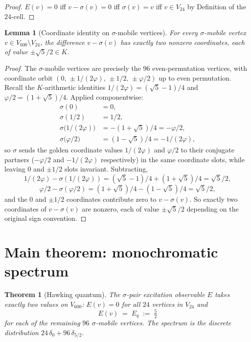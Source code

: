 \documentclass[11pt]{article}
\newtheorem{theorem}{Theorem}[section]
\newtheorem{lemma}{Lemma}[section]
\newcommand{\Vsixhundred}{V_{600}}
\newcommand{\Vtwentyfour}{V_{24}}
\newcommand{\sigmaG}{\sigma}
\newcommand{\Eq}{E_q}
\begin{document}
\begin{proof}
$E(v) = 0$ iff $v - \sigmaG(v) = 0$ iff $\sigmaG(v) = v$ iff
$v \in \Vtwentyfour$ by Definition of the $24$-cell.
\end{proof}

\begin{lemma}[Coordinate identity on $\sigmaG$-mobile vertices]\label{lem:coord}
For every $\sigmaG$-mobile vertex $v \in \Vsixhundred \setminus \Vtwentyfour$,
the difference $v - \sigmaG(v)$ has exactly \emph{two} nonzero coordinates,
each of value $\pm \sqrt{5}/2 \in K$.
\end{lemma}

\begin{proof}
The $\sigmaG$-mobile vertices are precisely the $96$ even-permutation
vertices, with coordinate orbit $(0,\, \pm 1/(2\varphi),\, \pm 1/2,\,
\pm \varphi/2)$ up to even permutation. Recall the $K$-arithmetic
identities $1/(2\varphi) = (\sqrt{5}-1)/4$ and
$\varphi/2 = (1+\sqrt{5})/4$. Applied componentwise:
\begin{align*}
\sigmaG(0) &= 0, \\
\sigmaG(1/2) &= 1/2, \\
\sigmaG\bigl(1/(2\varphi)\bigr) &= -(1+\sqrt{5})/4 = -\varphi/2, \\
\sigmaG\bigl(\varphi/2\bigr) &= (1-\sqrt{5})/4 = -1/(2\varphi),
\end{align*}
so $\sigmaG$ sends the golden coordinate values $1/(2\varphi)$ and
$\varphi/2$ to their conjugate partners ($-\varphi/2$ and $-1/(2\varphi)$
respectively) in the same coordinate slots, while leaving $0$ and
$\pm 1/2$ slots invariant.
Subtracting,
\[
  1/(2\varphi) - \sigmaG(1/(2\varphi)) =
  (\sqrt{5}-1)/4 + (1+\sqrt{5})/4 = \sqrt{5}/2,
\]
\[
  \varphi/2 - \sigmaG(\varphi/2) =
  (1+\sqrt{5})/4 - (1-\sqrt{5})/4 = \sqrt{5}/2,
\]
and the $0$ and $\pm 1/2$ coordinates contribute zero to $v - \sigmaG(v)$.
So exactly two coordinates of $v - \sigmaG(v)$ are nonzero, each of
value $\pm \sqrt{5}/2$ depending on the original sign convention.
\end{proof}

\section{Main theorem: monochromatic spectrum}\label{sec:main}

\begin{theorem}[Hawking quantum]\label{thm:Eq}
The $\sigmaG$-pair excitation observable $E$ takes exactly two values on
$\Vsixhundred$: $E(v) = 0$ for all $24$ vertices in $\Vtwentyfour$ and
\[
  E(v) \;=\; \Eq \;:=\; \tfrac{5}{2}
\]
for each of the remaining $96$ $\sigmaG$-mobile vertices. The spectrum
is the discrete distribution
\(
  24\,\delta_{0} + 96\,\delta_{5/2}.
\)
\end{theorem}
\end{document}
